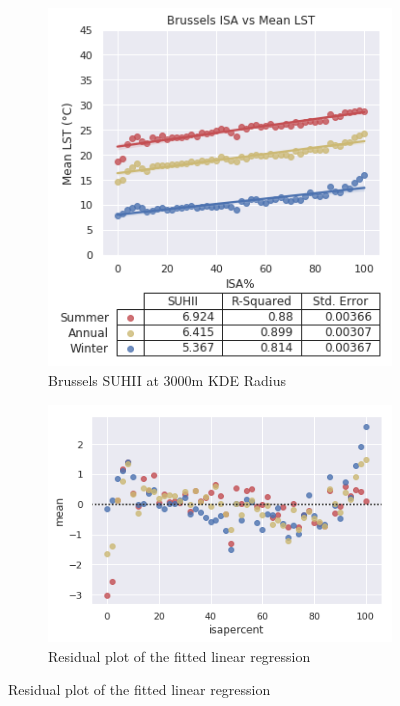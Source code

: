 \documentclass{article}
\begin{document}
\begin{figure}[htb]
    \begin{subfigure}{0.36\textwidth}
        \centering
        \includegraphics[width=1\linewidth]{Brussels.png}
        \caption{Brussels SUHII at 3000m KDE Radius}
        \label{fig:subim4}
    \end{subfigure}
    \begin{subfigure}{0.6\textwidth}
        \centering
        \includegraphics[width=1\linewidth]{BrusselsResid.png}
        \caption{Residual plot of the fitted linear regression}
        \label{fig:subim5}
    \end{subfigure}
    
\end{figure}
\end{document}
